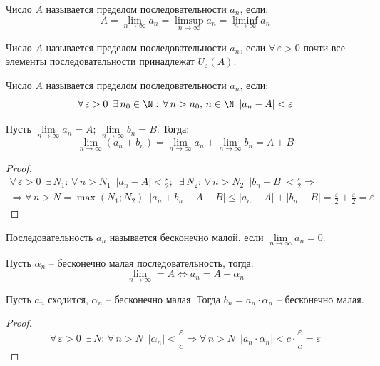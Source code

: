 \documentclass[12pt]{article}
\begin{document}
\begin{definition}
    Число $A$ называется пределом последовательности $a_n$, если:
    $$A=\lim_{n\to\infty}a_n=\limsup\limits_{n\to\infty}a_n=\liminf\limits_{n\to\infty}a_n$$
\end{definition}
\begin{definition}
    Число $A$ называется пределом последовательности $a_n$, если $\forall\,\varepsilon>0$ почти все элементы последовательности принадлежат $U_\varepsilon(A)$.
\end{definition}
\begin{definition}
    Число $A$ называется пределом последовательности $a_n$, если:
    $$\forall\,\varepsilon>0\enspace\exists\,n_0\in\N:\,\forall\,n>n_0,\,n\in\N\enspace |a_n-A|<\varepsilon$$
\end{definition}
\begin{theorem}
    Пусть $\lim\limits_{n\to\infty}a_n=A$; $\lim\limits_{n\to\infty}b_n=B$. Тогда:
    $$\lim\limits_{n\to\infty}(a_n+b_n)=\lim\limits_{n\to\infty}a_n+\lim\limits_{n\to\infty}b_n=A+B$$
\end{theorem}
\begin{proof}
    \begin{multline*}
        \forall\,\varepsilon>0\enspace\exists\,N_1:\,\forall\,n>N_1\enspace |a_n-A|<\frac{\varepsilon}{2};\enspace \exists\,N_2:\,\forall\,n>N_2\enspace |b_n-B|<\frac{\varepsilon}{2}\Longrightarrow\\
        \Longrightarrow\forall\,n>N=\max(N_1;N_2)\enspace |a_n+b_n-A-B|\leq |a_n-A|+|b_n-B|=\frac{\varepsilon}{2}+\frac{\varepsilon}{2}=\varepsilon
    \end{multline*}
\end{proof}
\begin{definition}
    Последовательность $a_n$ называется бесконечно малой, если $\lim\limits_{n\to\infty}a_n=0$.
\end{definition}
\begin{theorem}
    Пусть $\alpha_n$ -- бесконечно малая последовательность, тогда:
    $$\lim_{n\to\infty}=A\Longleftrightarrow a_n=A+\alpha_n$$
\end{theorem}
\begin{theorem}
    Пусть $a_n$ сходится, $\alpha_n$ -- бесконечно малая. Тогда $b_n=a_n\cdot\alpha_n$ -- бесконечно малая.
\end{theorem}
\begin{proof}
    $$\forall\,\varepsilon>0\enspace \exists\,N:\,\forall\,n>N\enspace |\alpha_n|<\frac{\varepsilon}{c}\Longrightarrow\forall\,n>N\enspace |a_n\cdot\alpha_n|<c\cdot\frac{\varepsilon}{c}=\varepsilon$$
\end{proof}
\end{document}
